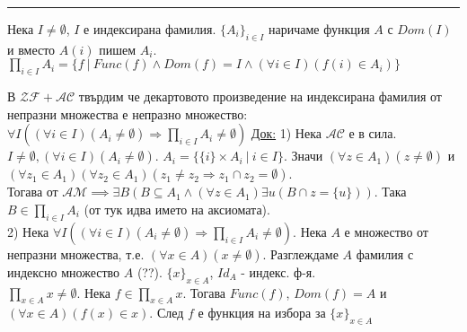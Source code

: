 \documentclass[fleqn, titlepage, 12pt]{report}
\begin{document}
\bigbreak
\hrule
\bigbreak

 Нека $ I \neq \emptyset $, $ I $ е индексирана фамилия.
$ \{ A_i \}_{i \in I} $ наричаме функция $ A $ с $ Dom(I) $ и вместо $ A(i) $ пишем $ A_i $.
\bigbreak
$ \prod_{i \in I} A_i = \{f\ |\ Func(f) \land Dom(f) = I \land (\forall{i \in I})(f(i) \in A_i)\}  $
\bigbreak

 В $ \mathcal{ZF} + \mathcal{AC} $ твърдим че декартовото произведение на индексирана фамилия от непразни
множества е непразно множество:
$ \forall{I}((\forall{i \in I})(A_i \neq \emptyset) \Rightarrow \prod_{i \in I} A_i \neq \emptyset  ) $
\bigbreak
\underline{Док:} 1) Нека $ \mathcal{AC} $ е в сила. $ I \neq \emptyset, (\forall{i \in I})(A_i \neq \emptyset) $.
$ A_i = \{\{ i \} \times  A_i\ |\ i \in I\} $. Значи $ (\forall{z \in A_1})(z \neq \emptyset) $ и
$ (\forall{z_1 \in A_1})(\forall{z_2 \in A_1})(z_1 \neq z_2 \Rightarrow z_1 \cap z_2 = \emptyset) $.\\
Тогава от $ \mathcal{AM} \implies \exists{B}(B \subseteq A_1 \land (\forall{z \in A_1})\exists{u}(B \cap z = \{ u \}))$.
Така $ B \in \prod_{i \in I} A_i $ (от тук идва името на аксиомата).\\
2) Нека $  \forall{I}((\forall{i \in I})(A_i \neq \emptyset) \Rightarrow \prod_{i \in I} A_i \neq \emptyset  )  $.
Нека $ A $ е множество от непразни множества, т.е. $ (\forall{x \in A})(x \neq \emptyset) $.
Разглеждаме $ A $ фамилия с индексно множество $ A $ (??). $ \{ x \}_{x \in A} $, $ Id_A $ - индекс. ф-я.\\
$ \prod_{x \in A} x \neq \emptyset   $. Нека $ f \in \prod_{x \in A} x $. Тогава $ Func(f) $, $ Dom(f) = A $ и
$ (\forall{x \in A})(f(x) \in x) $. След $ f $ е функция на избора за $ \{ x \}_{x \in A} $
\end{document}
